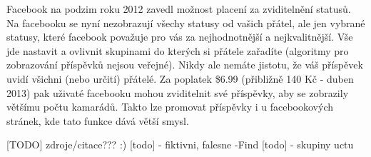 \documentclass[thesis=M,czech]{FITthesis}[2013/05/10]
\begin{document}
Facebook na podzim roku 2012 zavedl možnost placení za zviditelnění statusů. Na facebooku se nyní nezobrazují všechy statusy od vašich přátel, ale jen vybrané statusy, které facebook považuje pro vás za nejhodnotnější a nejkvalitnější. Vše jde nastavit a ovlivnit skupinami do kterých si přátele zařadíte (algoritmy pro zobrazování příspěvků nejsou veřejné). Nikdy ale nemáte jistotu, že váš příspěvek uvidí všichni (nebo určití) přátelé. Za poplatek \$6.99 (přibližně 140 Kč - duben 2013) pak uživaté facebooku mohou zviditelnit své příspěvky, aby se zobrazily většímu počtu kamarádů. Takto lze promovat příspěvky i u facebookových stránek, kde tato funkce dává větší smysl.


[TODO] zdroje/citace??? :)
[todo] - fiktivni, falesne -Find
[todo] - skupiny uctu



\appendix
\end{document}
